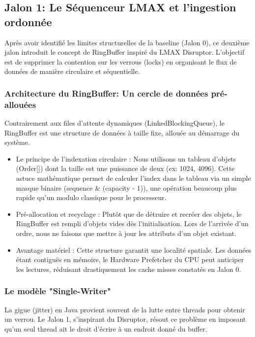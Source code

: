 \subsection{Jalon 1: Le Séquenceur LMAX et l'ingestion ordonnée}

Après avoir identifié les limites structurelles de la baseline (Jalon 0), ce deuxième jalon introduit le concept de RingBuffer inspiré du LMAX Disruptor. L'objectif est de supprimer la contention sur les verrous (locks) en organisant le flux de données de manière circulaire et séquentielle.

\subsubsection{Architecture du RingBuffer: Un cercle de données pré-allouées}

Contrairement aux files d'attente dynamiques (LinkedBlockingQueue), le RingBuffer est une structure de données à taille fixe, allouée au démarrage du système.

\begin{itemize}
    \item Le principe de l'indexation circulaire : Nous utilisons un tableau d'objets (Order[]) dont la taille est une puissance de deux (ex: 1024, 4096). Cette astuce mathématique permet de calculer l'index dans le tableau via un simple masque binaire (sequence \& (capacity - 1)), une opération beaucoup plus rapide qu'un modulo classique pour le processeur.
    \item Pré-allocation et recyclage : Plutôt que de détruire et recréer des objets, le RingBuffer est rempli d'objets vides dès l'initialisation. Lors de l'arrivée d'un ordre, nous ne faisons que mettre à jour les attributs d'un objet existant.
    \item Avantage matériel : Cette structure garantit une localité spatiale. Les données étant contiguës en mémoire, le Hardware Prefetcher du CPU peut anticiper les lectures, réduisant drastiquement les cache misses constatés en Jalon 0.
\end{itemize}

\subsubsection{Le modèle "Single-Writer"}

La gigue (jitter) en Java provient souvent de la lutte entre threads pour obtenir un verrou. Le Jalon 1, s'inspirant du Disruptor, résout ce problème en imposant qu'un seul thread ait le droit d'écrire à un endroit donné du buffer.

